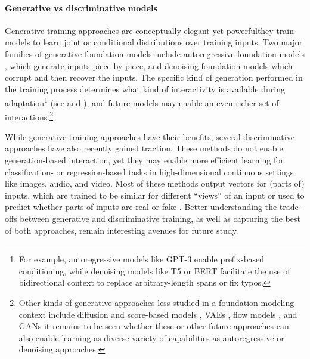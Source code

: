 \paragraph{Generative vs discriminative models}
Generative training approaches are conceptually elegant yet powerful\dash{}they train models to learn joint or conditional distributions over training inputs. Two major families of generative foundation models include autoregressive foundation models \citep{Oord2016WaveNetAG, Radford2018ImprovingLU, chen2020imagegpt, Yang2019XLNetGA, ramesh2021zeroshot}, which generate inputs piece by piece, and denoising foundation models \citep{devlin2019bert, raffel2019exploring}  which corrupt and then recover the inputs. The specific kind of generation performed in the training process determines what kind of interactivity is available during adaptation\footnote{For example, autoregressive models like GPT-3 enable prefix-based conditioning, while denoising models like T5 or BERT facilitate the use of bidirectional context to replace arbitrary-length spans or fix typos.} (see  and ), and future models may enable an even richer set  of interactions.\footnote{Other kinds of generative approaches less studied in a foundation modeling context include diffusion and score-based models \citep{SohlDickstein2015DeepUL, Song2019GenerativeMB, Ho2020DenoisingDP}, VAEs \citep{Kingma2014AutoEncodingVB}, flow models \citep{dinh2015nice, Kingma2018GlowGF}, and GANs \citep{goodfellow2014gan}\dash{}it remains to be seen whether these or other future approaches can also enable learning as diverse variety of capabilities as autoregressive or denoising approaches.}

While generative training approaches have their benefits, several discriminative approaches have also recently gained traction. These methods do not enable generation-based interaction, yet they may enable more efficient learning for classification- or regression-based tasks in high-dimensional continuous settings like images, audio, and video. Most of these methods output vectors for (parts of) inputs, which are trained to be similar for different ``views'' of an input \citep{Wu2018UnsupervisedFL, Oord2018RepresentationLW, chen2020simclr, He2020MomentumCF, Grill2020BootstrapYO, Caron2021EmergingPI, convirt, radford2021learning} or used to predict whether parts of inputs are real or fake \citep{Clark2020ELECTRAPT, Iida2021TABBIEPR}. Better understanding the trade-offs between generative and discriminative training, as well as capturing the best of both approaches, remain interesting avenues for future study.

